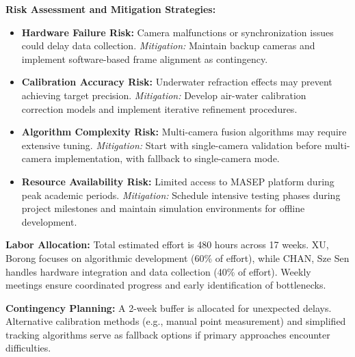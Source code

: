 \documentclass[11pt]{article}
\begin{document}
        \textbf{Risk Assessment and Mitigation Strategies:}
        \begin{itemize}
            \item \textbf{Hardware Failure Risk:} Camera malfunctions or synchronization issues could delay data collection. \textit{Mitigation:} Maintain backup cameras and implement software-based frame alignment as contingency.
            \item \textbf{Calibration Accuracy Risk:} Underwater refraction effects may prevent achieving target precision. \textit{Mitigation:} Develop air-water calibration correction models and implement iterative refinement procedures.
            \item \textbf{Algorithm Complexity Risk:} Multi-camera fusion algorithms may require extensive tuning. \textit{Mitigation:} Start with single-camera validation before multi-camera implementation, with fallback to single-camera mode.
            \item \textbf{Resource Availability Risk:} Limited access to MASEP platform during peak academic periods. \textit{Mitigation:} Schedule intensive testing phases during project milestones and maintain simulation environments for offline development.
        \end{itemize}

        \textbf{Labor Allocation:} Total estimated effort is 480 hours across 17 weeks. XU, Borong focuses on algorithmic development (60\% of effort), while CHAN, Sze Sen handles hardware integration and data collection (40\% of effort). Weekly meetings ensure coordinated progress and early identification of bottlenecks.

        \textbf{Contingency Planning:} A 2-week buffer is allocated for unexpected delays. Alternative calibration methods (e.g., manual point measurement) and simplified tracking algorithms serve as fallback options if primary approaches encounter difficulties.
\end{document}
